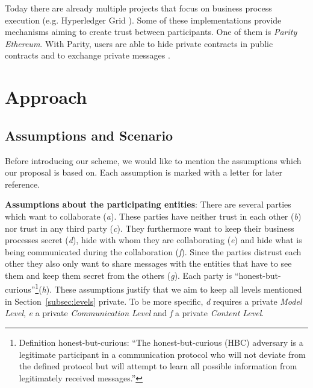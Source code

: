 \documentclass[runningheads]{llncs}
\newcommand{\comment}[1]{}
\newcommand{\ber}[1]{\textit{#1}}
\newcommand{\refsec}[1]{Section~\ref{#1}}
\renewcommand{\bigbreak}{}
\newcommand{\quotel}{``}
\newcommand{\quoter}{''}
\begin{document}
Today there are already multiple projects that focus on business process execution (e.g. Hyperledger Grid \cite{hyperledger}). Some of these implementations provide mechanisms aiming to create trust between participants. One of them is \textit{Parity Ethereum}. With Parity, users are able to hide private contracts in public contracts and to exchange private messages \cite{parity}.

\comment{However for private contract execution Parity is relying on validators,  \quotel  account[s] that can allow a private contract’s state [to] change\quoter  \cite{parity}. In our understanding this makes Parity insufficient for untrusted business execution, since, like private blockchains, it requires trust in one or multiple nodes. 
}




\section{Approach} \label{sec:approach}

\subsection{Assumptions and Scenario} \label{subsec:assumptions}

Before introducing our scheme, we would like to mention the assumptions which our proposal is based on. Each assumption is marked with a letter for later reference. 



\bigbreak
\textbf{Assumptions about the participating entities}: There are several parties which want to collaborate (\ber{a}). These parties have neither trust in each other (\ber{b}) nor  trust in any third party (\ber{c}). They furthermore want to keep their business processes secret (\ber{d}),  hide with whom they are collaborating (\ber{e}) and  hide what is being communicated during the collaboration (\ber{f}). Since the parties distrust each other they also  only want to share messages with the entities that have to see them and keep them secret from the others (\ber{g}). Each party  is  \quotel  honest-but-curious\quoter  \footnote{Definition honest-but-curious:  \quotel The honest-but-curious (HBC) adversary is a legitimate participant in a communication protocol who will not deviate from the defined protocol but will attempt to learn all possible information from legitimately received messages.\quoter  \cite{paverd2014modelling}}(\ber{h}). These assumptions justify that we aim to keep all levels mentioned in \refsec{subsec:levels} private. To be more specific, \ber{d} requires a private \ber{Model Level}, \ber{e} a private \ber{Communication Level} and \ber{f} a private  \ber{Content Level}.
\end{document}
